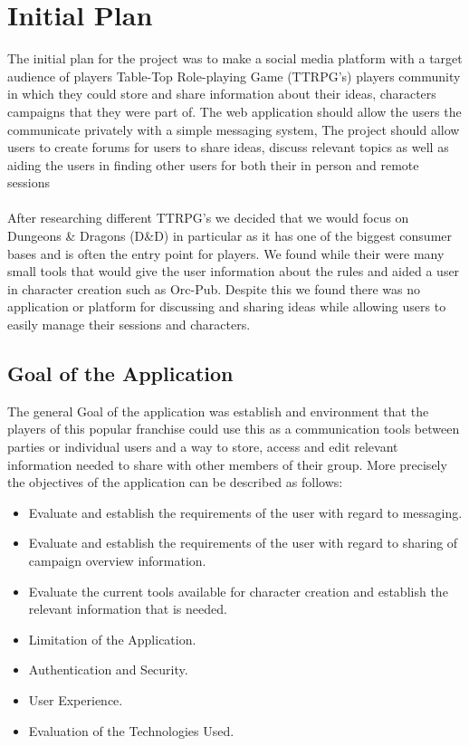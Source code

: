 \section{Initial Plan}
The initial plan for the project was to make a social media platform with a target audience of players Table-Top Role-playing Game (TTRPG's) players community in which they could store and share information about their ideas, characters campaigns that they were part of. The web application should allow the users the communicate privately with a simple messaging system, The project should allow users to create forums for users to share ideas, discuss relevant topics as well as aiding the users in finding other users for both their in person and remote sessions\\\\
After researching different TTRPG's we decided that we would focus on Dungeons \& Dragons (D\&D) in particular as it has one of the biggest consumer bases and is often the entry point for players. We found while their were many small tools that would give the user information about the rules and aided a user in character creation such as Orc-Pub. Despite this we found there was no application or platform for discussing and sharing ideas while allowing users to easily manage their sessions and characters.

\subsection{Goal of the Application}
The general Goal of the application was establish and environment that the players of this popular franchise could use this as a communication tools between parties or individual users and a way to store, access and edit relevant information needed to share with other members of their group.  More precisely the objectives of the application can be described as follows:

\begin{itemize}
    \item Evaluate and establish the requirements of the user with regard to messaging.
    \item Evaluate and establish the requirements of the user with regard to sharing of campaign overview information.
    \item Evaluate the current tools available for character creation and establish the relevant information that is needed.
    \item Limitation of the Application.
    \item Authentication and Security.
    \item User Experience.
    \item Evaluation of the Technologies Used.
\end{itemize}

